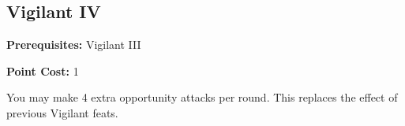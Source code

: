 \subsection*{Vigilant IV}\label{feat:vigilant4}

\noindent
\textbf{Prerequisites:} Vigilant III

\noindent
\textbf{Point Cost:} 1

You may make 4 extra opportunity attacks per round. This replaces the effect
of previous Vigilant feats.
